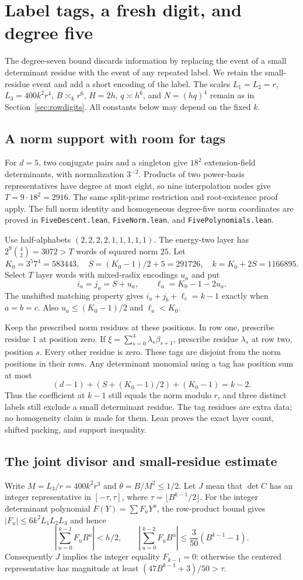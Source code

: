 \documentclass[11pt]{article}
\begin{document}
\section{Label tags, a fresh digit, and degree five}\label{sec:five}
The degree-seven bound discards information by replacing the event of a
small determinant residue with the event of any repeated label.
We retain the small-residue event and add a short encoding of the label.
The scales $L_1=L_2=r$, $L_3=400k^2r^4$, $B\asymp_k r^6$, $H=2h$,
$q\asymp h^6$, and $N=(hq)^4$ remain as in Section~\ref{sec:rowdigits}.
All constants below may depend on the fixed $k$.

\subsection{A norm support with room for tags}
For $d=5$, two conjugate pairs and a singleton give $18^2$ extension-field
determinants, with normalization $3^{-2}$. Products of two power-basis
representatives have degree at most eight, so nine interpolation nodes give
$T=9\cdot18^2=2916$. The same split-prime restriction and root-existence
proof apply. The full norm identity and homogeneous degree-five norm
coordinates are proved in \texttt{FiveDescent.lean}, \texttt{FiveNorm.lean},
and \texttt{FivePolynomials.lean}.

Use half-alphabets $(2,2,2,2,1,1,1,1,1)$. The energy-two layer has
$2^9\binom42=3072>T$ words of squared norm $25$. Let
\[
 K_0=3^5 7^4=583443,\quad S=(K_0-1)/2+5=291726,\quad
 k=K_0+2S=1166895.
\]
Select $T$ layer words with mixed-radix encodings $u_a$ and put
\[
 i_a=j_a=S+u_a,\qquad \ell_a=K_0-1-2u_a.
\]
The unshifted matching property gives
$i_a+j_b+\ell_c=k-1$ exactly when $a=b=c$.
Also $u_a\le(K_0-1)/2$ and $\ell_a<K_0$.

Keep the prescribed norm residues at these positions. In row one,
prescribe residue $1$ at position zero. If
$\xi=\sum_{s=0}^{4}\lambda_s\beta_{s+1}$, prescribe residue $\lambda_s$
at row two, position $s$. Every other residue is zero. These tags are
disjoint from the norm positions in their rows. Any determinant monomial
using a tag has position sum at most
\[
 (d-1)+(S+(K_0-1)/2)+(K_0-1)=k-2.
\]
Thus the coefficient at $k-1$ still equals the norm modulo $r$, and
three distinct labels still exclude a small determinant residue.
The tag residues are extra data; no homogeneity claim is made for them.
Lean proves the exact layer count, shifted packing, and support inequality.

\subsection{The joint divisor and small-residue estimate}
Write $M=L_3/r=400k^2r^3$ and $\theta=B/M^2\le1/2$.
Let $J$ mean that $\det C$ has an integer representative in $[-\tau,\tau]$,
where $\tau=\lfloor B^{k-1}/2\rfloor$. For the integer determinant
polynomial $F(Y)=\sum F_uY^u$, the row-product bound gives
$|F_u|\le6k^2L_1L_2L_3$ and hence
\[
 \left|\sum_{u=0}^{k-1}F_uB^u\right|<h/2,\qquad
 \left|\sum_{u=0}^{k-2}F_uB^u\right|\le\frac3{50}(B^{k-1}-1).
\]
Consequently $J$ implies the integer equality $F_{k-1}=0$: otherwise
the centered representative has magnitude at least
$(47B^{k-1}+3)/50>\tau$.
\end{document}
